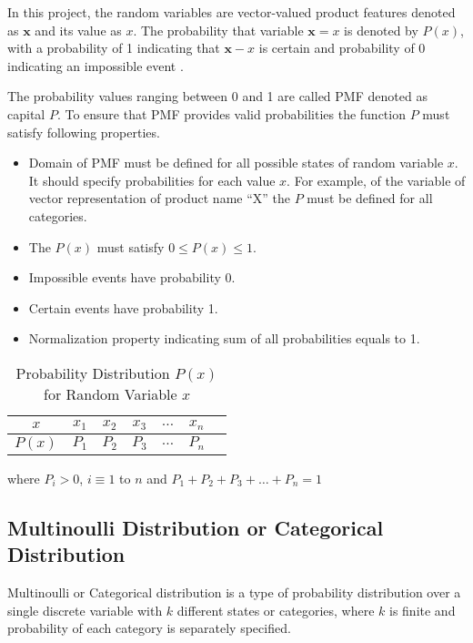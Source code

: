 In this project, the random variables are vector-valued product features denoted as $ \textbf{x} $ and its value as $ x $. The probability that variable $\textbf{x} = x$ is denoted by $ P(x) $, with a probability of 1 indicating that $\textbf{x}-x$ is certain and probability of 0 indicating an impossible event \parencite[Page 55]{Goodfellow-et-al-2016}.


The probability values ranging between 0  and 1 are called \acf{PMF} denoted as capital $ P $. To ensure that \acs*{PMF} provides valid probabilities the function $P$ must satisfy following properties.


\begin{itemize}
    \item Domain of PMF must be defined for all possible states of random variable $x$. It should specify probabilities for each value $x$. For example, of the variable of vector representation of product name ``X'' the $P$ must be defined for all categories.
    \item The $ P(x) $ must satisfy $0 \leq  P(x) \leq  1$.
    \item Impossible events have probability 0.
    \item Certain events have probability 1.
    \item Normalization property indicating sum of all probabilities equals to 1.
\end{itemize}


\begin{table}[H]
    \centering
    \begin{tabular}{ccccccc}
        \hline
        $x$ & $x_1$ & $x_2$ & $x_3$ & $\dots$ & $x_n$ \\
        \hline
        $P(x)$ & $P_1$ & $P_2$ & $P_3$ & $\dots$ & $P_n$ \\
        \hline
    \end{tabular}
    \caption{Probability Distribution $P(x)$ for Random Variable $x$}
    \label{tab:probability-distribution}
\end{table}


where \(P_i > 0\), \(i \equiv 1\) to \(n\) and \(P_1 + P_2 + P_3 + \ldots + P_n = 1\) \\

\subsection*{Multinoulli Distribution or Categorical Distribution}

Multinoulli or Categorical distribution is a type of probability distribution over a single discrete variable with $ k $ different states or categories, where $ k $ is finite and probability of each category is separately specified.


